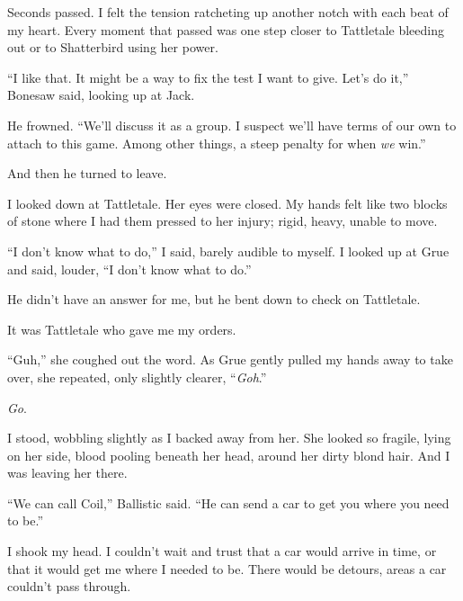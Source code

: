 Seconds passed.  I felt the tension ratcheting up another notch with each beat of my heart.  Every moment that passed was one step closer to Tattletale bleeding out or to Shatterbird using her power.



``I like that.  It might be a way to fix the test I want to give.  Let's do it,'' Bonesaw said, looking up at Jack.



He frowned.  ``We'll discuss it as a group.  I suspect we'll have terms of our own to attach to this game.  Among other things, a steep penalty for when \emph{we} win.''



And then he turned to leave.



I looked down at Tattletale.  Her eyes were closed.  My hands felt like two blocks of stone where I had them pressed to her injury; rigid, heavy, unable to move.



``I don't know what to do,'' I said, barely audible to myself.  I looked up at Grue and said, louder, ``I don't know what to do.''



He didn't have an answer for me, but he bent down to check on Tattletale.



It was Tattletale who gave me my orders.



``Guh,'' she coughed out the word.  As Grue gently pulled my hands away to take over, she repeated, only slightly clearer, ``\emph{Goh}.''



\emph{Go}.



I stood, wobbling slightly as I backed away from her.  She looked so fragile, lying on her side, blood pooling beneath her head, around her dirty blond hair.  And I was leaving her there.



``We can call Coil,'' Ballistic said.  ``He can send a car to get you where you need to be.''



I shook my head.  I couldn't wait and trust that a car would arrive in time, or that it would get me where I needed to be.  There would be detours, areas a car couldn't pass through.



